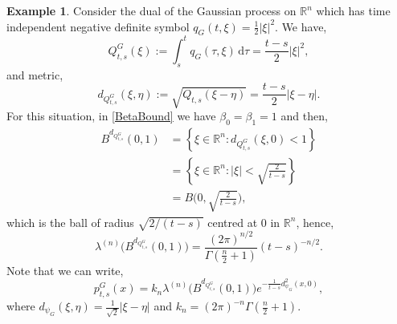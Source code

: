 \documentclass[a4paper, 12pt]{report}
\theoremstyle{remark}
\theoremstyle{definition}
\newtheorem{example}[theorem]{Example}
\begin{document}
\begin{example}\label{TDSGMetcE2}
Consider the dual of the Gaussian process on $\mathbb{R}^n$ which has time independent negative definite symbol $q_G(t, \xi) = \frac{1}{2}|\xi|^2$.  We have,
$$
Q_{t, s}^G(\xi) := \int_s^tq_G(\tau, \xi)\,\mathrm{d}\tau = \frac{t -s}{2}|\xi|^2,
$$
and metric,
$$
d_{Q_{t, s}^G}(\xi, \eta) := \sqrt{Q_{t, s}(\xi - \eta)} = \frac{t - s}{2}|\xi - \eta|.
$$
For this situation, in \eqref{BetaBound} we have $\beta_0 = \beta_1 = 1$ and then,
$$
\begin{aligned}
B^{d_{Q_{t, s}^G}}(0, 1) & = \left\{\xi \in \mathbb{R}^n : d_{Q_{t, s}^G}(\xi, 0) < 1\right\}\\
& = \left\{\xi \in \mathbb{R}^n : |\xi| < \sqrt{\frac{2}{t - s}}\right\}\\
& = B\bigg(0, \sqrt{\frac{2}{t - s}}\bigg),
\end{aligned}
$$
which is the ball of radius $\sqrt{2/(t - s)}$ centred at $0$ in $\mathbb{R}^n$, hence,
$$
\lambda^{(n)}\Big(B^{d_{Q_{t, s}^G}}(0, 1)\Big) = \frac{(2\pi)^{n/2}}{\Gamma(\frac{n}{2} + 1)}(t - s)^{-n/2}.
$$
Note that we can write,
$$
p_{t, s}^G(x) = k_n\lambda^{(n)}\Big(B^{d_{Q_{t, s}^G}}(0, 1)\Big)e^{-\frac{1}{t - s}d_{\psi_G}^2(x, 0)},
$$
where $d_{\psi_G}(\xi, \eta) = \frac{1}{\sqrt{2}}|\xi - \eta|$ and $k_n = (2\pi)^{-n}\Gamma(\frac{n}{2} + 1)$.
\end{example}
\end{document}
